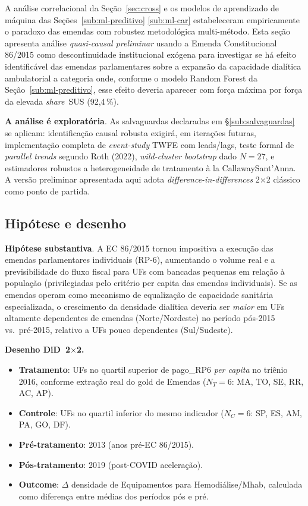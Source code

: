 \documentclass[12pt,a4paper,oneside]{article}
\begin{document}
A análise correlacional da Seção~\ref{sec:cross} e os modelos de
aprendizado de máquina das Seções~\ref{sub:ml-preditivo}\textendash%
\ref{sub:ml-car} estabeleceram empiricamente o paradoxo das
emendas com robustez metodológica multi-método. Esta seção
apresenta análise \textit{quasi-causal preliminar} usando a
Emenda Constitucional 86/2015 como descontinuidade institucional
exógena para investigar se há efeito identificável das emendas
parlamentares sobre a expansão da capacidade dialítica
ambulatorial \textemdash{} a categoria onde, conforme o modelo
Random Forest da Seção~\ref{sub:ml-preditivo}, esse efeito
deveria aparecer com força máxima por força da elevada
\textit{share}~SUS (92,4\,\%).

\textbf{A análise é exploratória}. As salvaguardas declaradas em
§\ref{sub:salvaguardas} se aplicam: identificação causal robusta
exigirá, em iterações futuras, implementação completa de
\textit{event-study} TWFE com leads/lags, teste formal de
\textit{parallel trends} segundo Roth (2022), \textit{wild-cluster
bootstrap} dado $N=27$, e estimadores robustos a heterogeneidade
de tratamento à la Callaway\textendash Sant'Anna. A versão
preliminar apresentada aqui adota \textit{difference-in-differences}
2$\times$2 clássico como ponto de partida.

\subsection{Hipótese e desenho}

\textbf{Hipótese substantiva}. A EC 86/2015 tornou impositiva a
execução das emendas parlamentares individuais (RP-6),
aumentando o volume real e a previsibilidade do fluxo fiscal
para UFs com bancadas pequenas em relação à população
(privilegiadas pelo critério per capita das emendas individuais).
Se as emendas operam como mecanismo de equalização de capacidade
sanitária especializada, o crescimento da densidade dialítica
deveria ser \textit{maior} em UFs altamente dependentes de
emendas (Norte/Nordeste) no período pós-2015 vs.\ pré-2015,
relativo a UFs pouco dependentes (Sul/Sudeste).

\textbf{Desenho DiD~2$\times$2.}
\begin{itemize}
\item \textbf{Tratamento}: UFs no quartil superior de pago\_RP6
\textit{per capita} no triênio 2016, conforme
extração real do gold de Emendas
($N_T = 6$: MA, TO, SE, RR, AC, AP).
\item \textbf{Controle}: UFs no quartil inferior do mesmo
indicador ($N_C = 6$: SP, ES, AM, PA, GO, DF).
\item \textbf{Pré-tratamento}: 2013 (anos pré-EC
86/2015).
\item \textbf{Pós-tratamento}: 2019 (post-COVID
aceleração).
\item \textbf{Outcome}: $\Delta$ densidade de Equipamentos para
Hemodiálise/Mhab, calculada como diferença entre médias dos
períodos pós e pré.
\end{itemize}
\end{document}
